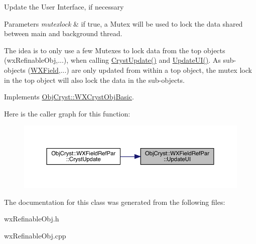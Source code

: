 Update the User Interface, if necessary


\begin{DoxyParams}{Parameters}
{\em mutexlock} & if true, a Mutex will be used to lock the data shared between main and background thread.\\
\hline
\end{DoxyParams}
The idea is to only use a few Mutexes to lock data from the top objects (wx\+Refinable\+Obj,...), when calling \mbox{\hyperlink{class_obj_cryst_1_1_w_x_field_ref_par_a91bdc3391485b7376466af6046a62df7}{Cryst\+Update()}} and \mbox{\hyperlink{class_obj_cryst_1_1_w_x_field_ref_par_aa11b53ed79e160ec1201c5743aef80ca}{Update\+U\+I()}}. As sub-\/objects (\mbox{\hyperlink{class_obj_cryst_1_1_w_x_field}{W\+X\+Field}},...) are only updated from within a top object, the mutex lock in the top object will also lock the data in the sub-\/objects. 

Implements \mbox{\hyperlink{class_obj_cryst_1_1_w_x_cryst_obj_basic_a3818940b7031ff7e45cf2178c4a99c90}{Obj\+Cryst\+::\+W\+X\+Cryst\+Obj\+Basic}}.

Here is the caller graph for this function\+:
\nopagebreak
\begin{figure}[H]
\begin{center}
\leavevmode
\includegraphics[width=350pt]{class_obj_cryst_1_1_w_x_field_ref_par_aa11b53ed79e160ec1201c5743aef80ca_icgraph}
\end{center}
\end{figure}


The documentation for this class was generated from the following files\+:\begin{DoxyCompactItemize}
\item 
wx\+Refinable\+Obj.\+h\item 
wx\+Refinable\+Obj.\+cpp\end{DoxyCompactItemize}
